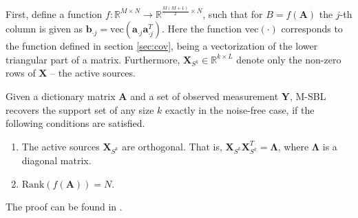 First, define a function $f : \mathbb{R}^{M \times N} \rightarrow \mathbb{R}^{\frac{M(M+1)}{2}\times N}$, such that for $B = f(\mathbf{A})$ the $j$-th column is given as $\mathbf{b}_{\cdot j} = \text{vec}(\mathbf{a}_{\cdot j}\mathbf{a}_{\cdot j}^T)$. 
Here the function $\text{vec}(\cdot)$ corresponds to the function defined in section \ref{sec:cov}, being a vectorization of the lower triangular part of a matrix. 
Furthermore, $\mathbf{X}_{S^k} \in \mathbb{R}^{k \times L}$ denote only the non-zero rows of $\mathbf{X}$ -- the active sources.  
\begin{theorem}
Given a dictionary matrix $\mathbf{A}$ and a set of observed measurement $\mathbf{Y}$, M-SBL recovers the support set of any size $k$ exactly in the noise-free case, if the following conditions are satisfied. 
\begin{enumerate}
\item The active sources $\mathbf{X}_{S^k}$ are orthogonal. That is, $\mathbf{X}_{S^k} \mathbf{X}_{S^k}^T = \boldsymbol{\Lambda}$, where $\boldsymbol{\Lambda}$ is a diagonal matrix.
\item $\text{Rank}(f(\mathbf{A}))= N$.
\end{enumerate}
The proof can be found in \cite[p. 16]{Balkan2014}.
\label{th:conditions}
\end{theorem}  

